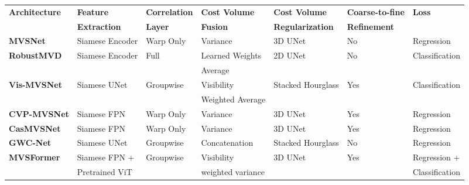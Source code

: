 \begin{table}[htbp]
\scriptsize
\centering
\def\arraystretch{1.5}
\begin{tabular}{|l|l|l|l|l|l|l|}
\hline
\rowcolor{bgcolor}
\textbf{Architecture} & \textbf{Feature} & \textbf{Correlation} & \textbf{Cost Volume} & \textbf{Cost Volume} & \textbf{Coarse-to-fine} & \textbf{Loss}  \\ 
\rowcolor{bgcolor}
& \textbf{Extraction} & \textbf{Layer} & \textbf{Fusion} & \textbf{Regularization} & \textbf{Refinement} &   \\ \hline

\textbf{MVSNet}       & Siamese Encoder             & Warp Only                  & Variance                    & 3D UNet                    & No                          & Regression     \\ \hline


\textbf{RobustMVD}    & Siamese Encoder             & Full           & Learned Weights      & 2D UNet                    & No                          & Classification \\ 
    &              &            & Average      &                     &                           &  \\ \hline


\textbf{Vis-MVSNet}   & Siamese UNet                & Groupwise                  & Visibility                    & Stacked Hourglass                   & Yes                         & Classification \\ 
    &              &            & Weighted Average      &                     &                           &  \\ \hline

    
\textbf{CVP-MVSNet}   & Siamese FPN                & Warp Only                  & Variance                    & 3D UNet                   & Yes                         & Regression     \\ \hline


\textbf{CasMVSNet}    & Siamese FPN                & Warp Only                  & Variance                    & 3D UNet                   & Yes                         & Regression     \\ \hline


\textbf{GWC-Net} & Siamese UNet & Groupwise  & Concatenation & Stacked Hourglass & No & Regression \\ \hline


\textbf{MVSFormer} & Siamese FPN + & Groupwise & Visibility  & 3D UNet & Yes & Regression + \\
    &Pretrained ViT              &            &weighted variance       &                     &                           & Classification  \\ \hline


\end{tabular}
\end{table}
